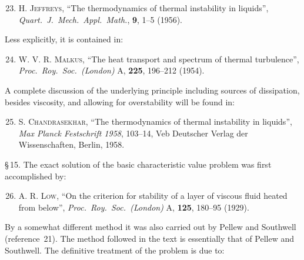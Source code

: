 \begin{enumerate}
\setcounter{enumi}{22}

\item \textsc{H. Jeffreys}, ``The thermodynamics of thermal instability in liquids'',
  \textit{Quart.\ J.\ Mech.\ Appl.\ Math.}, \textbf{9}, 1--5 (1956).

\end{enumerate}

\noindent Less explicitly, it is contained in:

\begin{enumerate}
\setcounter{enumi}{23}

\item \textsc{W. V. R. Malkus}, ``The heat transport and spectrum of thermal turbulence'',
  \textit{Proc.\ Roy.\ Soc.\ (London)} A, \textbf{225}, 196--212 (1954).

\end{enumerate}

\noindent A complete discussion of the underlying principle including sources of dissipation,
besides viscosity, and allowing for overstability will be found in:

\begin{enumerate}
\setcounter{enumi}{24}

\item \textsc{S. Chandrasekhar}, ``The thermodynamics of thermal instability in liquids'',
  \textit{Max Planck Festschrift 1958}, 103--14, Veb Deutscher Verlag der Wissenschaften,
  Berlin, 1958.

\end{enumerate}

\noindent \S\,15. The exact solution of the basic characteristic value problem was first
accomplished by:

\begin{enumerate}
\setcounter{enumi}{25}

\item \textsc{A. R. Low}, ``On the criterion for stability of a layer of viscous fluid heated
  from below'', \textit{Proc.\ Roy.\ Soc.\ (London)} A, \textbf{125}, 180--95 (1929).

\end{enumerate}

\noindent By a somewhat different method it was also carried out by Pellew and Southwell
(reference~21). The method followed in the text is essentially that of Pellew
and Southwell. The definitive treatment of the problem is due to:

